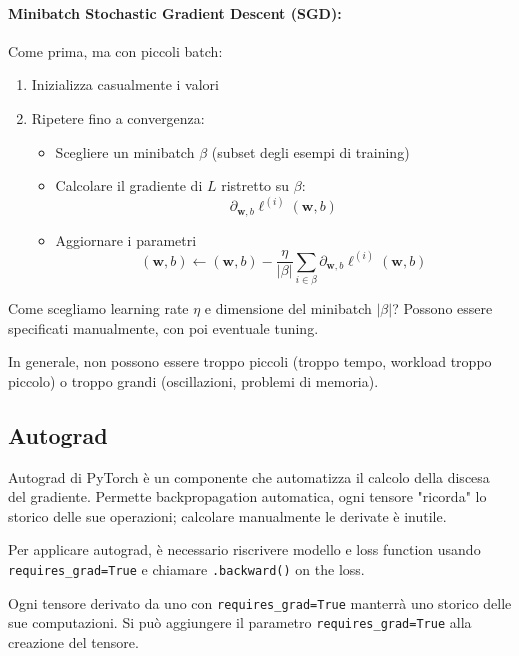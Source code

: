 \paragraph{Minibatch Stochastic Gradient Descent (SGD):} Come prima, ma con piccoli batch:
\begin{enumerate}
    \item Inizializza casualmente i valori
    
    \item Ripetere fino a convergenza:
    \begin{itemize}
        \item Scegliere un minibatch $\beta$ (subset degli esempi di training)
        
        \item Calcolare il gradiente di $L$ ristretto su $\beta$:
        $$ \partial_{\bm w, b} \ell^{(i)} (\bm w, b) $$
        
        \item Aggiornare i parametri 
        $$ (\bm w, b) \leftarrow (\bm w, b) - \frac{\eta}{|\beta|} \sum_{i \in \beta} \partial_{\bm w, b} \ell^{(i)} (\bm w, b) $$
    \end{itemize}
\end{enumerate}

Come scegliamo learning rate $\eta$ e dimensione del minibatch $|\beta|$? Possono essere specificati manualmente, con poi eventuale tuning. 

In generale, non possono essere troppo piccoli (troppo tempo, workload troppo piccolo) o troppo grandi (oscillazioni, problemi di memoria).

\subsection{Autograd}

Autograd di PyTorch è un componente che automatizza il calcolo della discesa del gradiente. Permette backpropagation automatica, ogni tensore "ricorda" lo storico delle sue operazioni; calcolare manualmente le derivate è inutile.

Per applicare autograd, è necessario riscrivere modello e loss function usando \texttt{requires\_grad=True} e chiamare \texttt{.backward()} on the loss.

Ogni tensore derivato da uno con \texttt{requires\_grad=True} manterrà uno storico delle sue computazioni. Si può aggiungere il parametro \texttt{requires\_grad=True} alla creazione del tensore.

